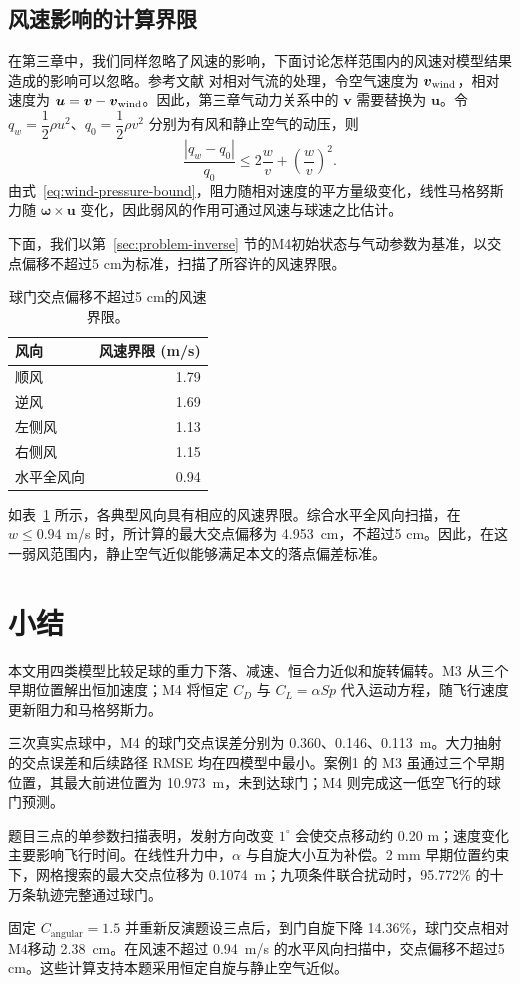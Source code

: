 \documentclass[12pt,letterpaper]{article}
\newcommand{\WMXMFourGoalError}{0.360}
\newcommand{\WOHMFourGoalError}{0.113}
\newcommand{\WRMFourGoalError}{0.146}
\newcommand{\WMXMThreeMaxX}{10.973}
\newcommand{\ChSixSpinLoss}{14.36}
\newcommand{\ChSixGoalShiftCM}{2.38}
\newcommand{\ChSixWindBound}{0.94}
\newcommand{\ChSixWindMaxShift}{4.953}
\newcommand{\ChSixWindTable}{\begin{table}[H]\centering\small
\caption{球门交点偏移不超过5 cm的风速界限。}\label{tab:wind}
\setlength{\tabcolsep}{5pt}\begin{tabular}{lr}\toprule
风向 & 风速界限 (m/s)\\\midrule
顺风 & 1.79\\
逆风 & 1.69\\
左侧风 & 1.13\\
右侧风 & 1.15\\
水平全风向 & 0.94\\
\bottomrule\end{tabular}\end{table}}
\newcommand{\SensitivityConditionalShift}{0.1074}
\newcommand{\MCClearPercent}{95.772}
\begin{document}
\subsection{风速影响的计算界限}\label{sec:wind}
在第三章中，我们同样忽略了风速的影响，下面讨论怎样范围内的风速对模型结果造成的影响可以忽略。参考文献\cite{maponi} 对相对气流的处理，令空气速度为 $\boldsymbol v_{\rm wind}$，相对速度为 $\boldsymbol u=\boldsymbol v-\boldsymbol v_{\rm wind}$。因此，第三章气动力关系中的 $\boldsymbol v$ 需要替换为 $\boldsymbol u$。令 $q_w=\dfrac{1}{2}\rho u^2$、$q_0=\dfrac{1}{2}\rho v^2$ 分别为有风和静止空气的动压，则
\begin{equation}
\dfrac{|q_w-q_0|}{q_0}\leq 2\dfrac{w}{v}+\left(\dfrac{w}{v}\right)^2.
\label{eq:wind-pressure-bound}\end{equation}
由式~\eqref{eq:wind-pressure-bound}，阻力随相对速度的平方量级变化，线性马格努斯力随 $\boldsymbol\omega\times\boldsymbol u$ 变化，因此弱风的作用可通过风速与球速之比估计。

下面，我们以第~\ref{sec:problem-inverse} 节的M4初始状态与气动参数为基准，以交点偏移不超过5 cm为标准，扫描了所容许的风速界限。
\ChSixWindTable
如表~\ref{tab:wind} 所示，各典型风向具有相应的风速界限。综合水平全风向扫描，在 $w\leq\ChSixWindBound$ m/s 时，所计算的最大交点偏移为 \ChSixWindMaxShift\ cm，不超过5 cm。因此，在这一弱风范围内，静止空气近似能够满足本文的落点偏差标准。

\section{小结}
本文用四类模型比较足球的重力下落、减速、恒合力近似和旋转偏转。M3 从三个早期位置解出恒加速度；M4 将恒定 $C_D$ 与 $C_L=\alpha Sp$ 代入运动方程，随飞行速度更新阻力和马格努斯力。

三次真实点球中，M4 的球门交点误差分别为 \WMXMFourGoalError、\WRMFourGoalError、\WOHMFourGoalError\ m。大力抽射的交点误差和后续路径 RMSE 均在四模型中最小。案例1 的 M3 虽通过三个早期位置，其最大前进位置为 \WMXMThreeMaxX\ m，未到达球门；M4 则完成这一低空飞行的球门预测。

题目三点的单参数扫描表明，发射方向改变 $1^\circ$ 会使交点移动约 0.20 m；速度变化主要影响飞行时间。在线性升力中，$\alpha$ 与自旋大小互为补偿。2 mm 早期位置约束下，网格搜索的最大交点位移为 \SensitivityConditionalShift\ m；九项条件联合扰动时，\MCClearPercent\% 的十万条轨迹完整通过球门。

固定 $C_{\mathrm{angular}}=1.5$ 并重新反演题设三点后，到门自旋下降 \ChSixSpinLoss\%，球门交点相对M4移动 \ChSixGoalShiftCM\ cm。在风速不超过 \ChSixWindBound\ m/s 的水平风向扫描中，交点偏移不超过5 cm。这些计算支持本题采用恒定自旋与静止空气近似。
\end{document}
